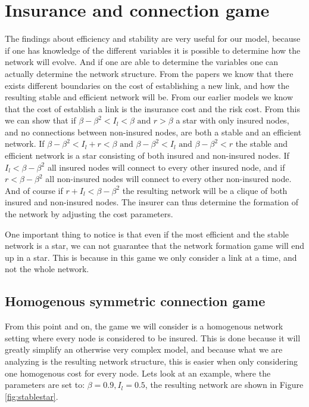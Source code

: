 \section{Insurance and connection game}
The findings about efficiency and stability are very useful for our model, because if one has knowledge of the different variables it is possible to determine how the network will evolve. And if one are able to determine the variables one can actually determine the network structure.
From the papers we know that there exists different boundaries on the cost of establishing a new link, and how the resulting stable and efficient network will be.
From our earlier models we know that the cost of establish a link is the insurance cost and the risk cost. From this we can show that if $\beta - \beta^2 <I_{l}<\beta \text{ and } r>\beta$ a star with only insured nodes, and no connections between non-insured nodes, are both a stable and an efficient network. If $\beta - \beta^2 <I_{l}+r<\beta \text{ and } \beta - \beta^2<I_{l} \text{ and } \beta - \beta^2<r $ the stable and efficient network is a star consisting of both insured and non-insured nodes. If $I_{l}<\beta-\beta^2$ all insured nodes will connect to every other insured node, and if $r<\beta-\beta^2$ all non-insured nodes will connect to every other non-insured node.
And of course if $r+I_{l}<\beta-\beta^2$ the resulting network will be a clique of both insured and non-insured nodes.
The insurer can thus determine the formation of the network by adjusting the cost parameters. 

One important thing to notice is that even if the most efficient and the stable network is a star, we can not guarantee that the network formation game will end up in a star. This is because in this game we only consider a link at a time, and not the whole network.

\subsection{Homogenous symmetric connection game}
From this point and on, the game we will consider is a homogenous network setting where every node is considered to be insured.
This is done because it will greatly simplify an otherwise very complex model, and because what we are analyzing  is the resulting network structure, this is easier when only considering one homogenous cost for every node.
Lets look at an example, where the parameters are set to: $\beta=0.9, I_{l}=0.5$, the resulting network are shown in Figure \ref{fig:stablestar}.



